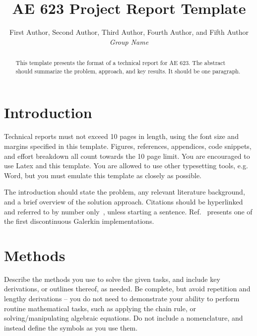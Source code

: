 \documentclass[11pt, twocolumn]{article}
\begin{document}
\title{\vspace{-5ex} \bf AE 623 Project Report Template}

\author{First Author, Second Author, Third Author, Fourth Author, and Fifth Author\\
\emph{Group Name}}

\maketitle

\begin{abstract}
This template presents the format of a technical report for AE 623.
The abstract should summarize the problem, approach, and key results.
It should be one paragraph.
\end{abstract}


\section{Introduction}

Technical reports must not exceed 10 pages in length, using the font
size and margins specified in this template.  Figures, references,
appendices, code snippets, and effort breakdown all count towards
the 10 page limit.  You are encouraged to use Latex and this template.
You are allowed to use other typesetting tools, e.g. Word, but you
must emulate this template as closely as possible.

The introduction should state the problem, any relevant literature
background, and a brief overview of the solution approach.  Citations
should be hyperlinked and referred to by number
only~\cite{Reed_Hill_1973}, unless starting a sentence.
Ref.~\cite{Reed_Hill_1973} presents one of the first discontinuous
Galerkin implementations.


\section{Methods}

Describe the methods you use to solve the given tasks, and include key
derivations, or outlines thereof, as needed.  Be complete, but avoid
repetition and lengthy derivations -- you do not need to demonstrate
your ability to perform routine mathematical tasks, such as applying
the chain rule, or solving/manipulating algebraic equations.  Do not
include a nomenclature, and instead define the symbols as you use
them.
\end{document}
